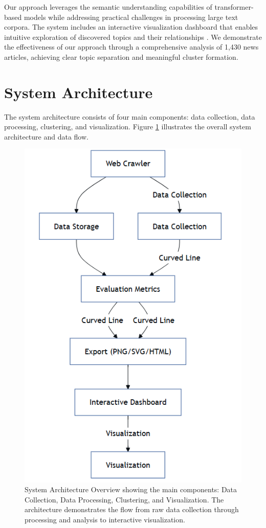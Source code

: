 \documentclass[conference]{IEEEtran}
\begin{document}
Our approach leverages the semantic understanding capabilities of transformer-based models while addressing practical challenges in processing large text corpora. The system includes an interactive visualization dashboard that enables intuitive exploration of discovered topics and their relationships \cite{plotly2015}. We demonstrate the effectiveness of our approach through a comprehensive analysis of 1,430 news articles, achieving clear topic separation and meaningful cluster formation.

\section{System Architecture}
The system architecture consists of four main components: data collection, data processing, clustering, and visualization. Figure \ref{fig:architecture} illustrates the overall system architecture and data flow.

\begin{figure}[!t]
\centering
\includegraphics[width=\columnwidth]{images/architecture.png}
\caption{System Architecture Overview showing the main components: Data Collection, Data Processing, Clustering, and Visualization. The architecture demonstrates the flow from raw data collection through processing and analysis to interactive visualization.}
\label{fig:architecture}
\end{figure}
\end{document}
